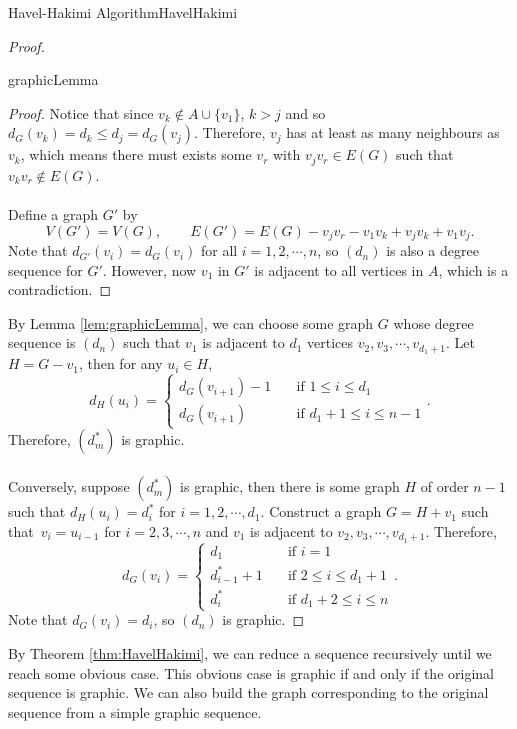 \documentclass[math, code]{amznotes}
\theoremstyle{remark}
\begin{document}
\begin{thmbox}{Havel-Hakimi Algorithm}{HavelHakimi}
\begin{proof}
\begin{lembox}{}{graphicLemma}
\begin{proof}
                Notice that since $v_k \notin A \cup \{v_1\}$, $k > j$ and so $d_G(v_k) = d_k \leq d_j = d_G(v_j)$. Therefore, $v_j$ has at least as many neighbours as $v_k$, which means there must exists some $v_r$ with $v_jv_r \in E(G)$ such that $v_kv_r \notin E(G)$.
                \\\\
                Define a graph $G'$ by
                \begin{equation*}
                    V(G') = V(G), \qquad E(G') = E(G) - v_jv_r - v_1v_k + v_jv_k + v_1v_j.
                \end{equation*}
                Note that $d_{G'}(v_i) = d_G(v_i)$ for all $i = 1, 2, \cdots, n$, so $(d_n)$ is also a degree sequence for $G'$. However, now $v_1$ in $G'$ is adjacent to all vertices in $A$, which is a contradiction.
            \end{proof}
        \end{lembox}
        By Lemma \ref{lem:graphicLemma}, we can choose some graph $G$ whose degree sequence is $(d_n)$ such that $v_1$ is adjacent to $d_1$ vertices $v_2, v_3, \cdots, v_{d_1 + 1}$. Let $H = G - v_1$, then for any $u_i \in H$,
        \begin{equation*}
            d_H(u_i) = \begin{cases}
                d_G(v_{i + 1}) - 1 & \quad\textrm{if } 1 \leq i \leq d_1 \\
                d_G(v_{i + 1}) & \quad\textrm{if } d_1 + 1 \leq i \leq n - 1
            \end{cases}.
        \end{equation*}
        Therefore, $\left(d^*_m\right)$ is graphic.
        \\\\
        Conversely, suppose $\left(d^*_m\right)$ is graphic, then there is some graph $H$ of order $n - 1$ such that $d_H(u_i) = d^*_i$ for $i = 1, 2, \cdots, d_1$. Construct a graph $G = H + v_1$ such that~$v_i = u_{i - 1}$ for $i = 2, 3, \cdots, n$ and $v_1$ is adjacent to $v_2, v_3, \cdots, v_{d_1 + 1}$. Therefore,
        \begin{equation*}
            d_G(v_i) = \begin{cases}
                d_1 & \quad\textrm{if } i = 1 \\
                d^*_{i - 1} + 1 & \quad\textrm{if } 2 \leq i \leq d_1 + 1 \\
                d^*_{i} & \quad\textrm{if } d_1 + 2 \leq i \leq n
            \end{cases}.
        \end{equation*}
        Note that $d_G(v_i) = d_i$, so $(d_n)$ is graphic.
    \end{proof}
\end{thmbox}
By Theorem \ref{thm:HavelHakimi}, we can reduce a sequence recursively until we reach some obvious case. This obvious case is graphic if and only if the original sequence is graphic. We can also build the graph corresponding to the original sequence from a simple graphic sequence.
\end{document}
